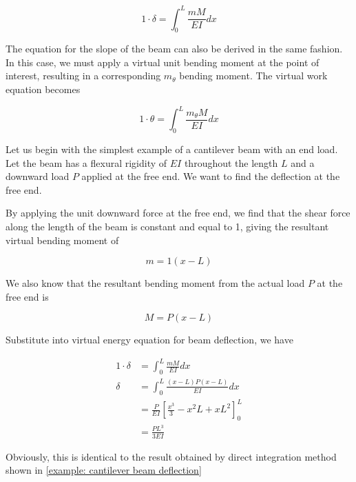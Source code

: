 \documentclass[
10pt,
a4paper,
openany,
svgnames,
]{kaobook} %
\begin{document}
\begin{equation}
  1 \cdot \delta = \int_0^L \frac{mM}{EI} dx
\end{equation}

The equation for the slope of the beam can also be derived in the same fashion. In this case, we must apply a virtual unit bending moment at the point of interest, resulting in a corresponding $m_\theta$ bending moment. The virtual work equation becomes

\begin{equation}
  1 \cdot \theta = \int_0^L \frac{m_\theta M}{EI} dx
\end{equation}

\begin{example}
  Let us begin with the simplest example of a cantilever beam with an end load. Let the beam has a flexural rigidity of $EI$ throughout the length $L$ and a downward load $P$ applied at the free end. We want to find the deflection at the free end.

  \centering
\end{example}
\begin{solution}
  By applying the unit downward force at the free end, we find that the shear force along the length of the beam is constant and equal to 1, giving the resultant virtual bending moment of

  \begin{equation*}
    m = 1(x - L)
  \end{equation*}

  We also know that the resultant bending moment from the actual load $P$ at the free end is

  \begin{equation*}
    M = P(x - L)
  \end{equation*}

  Substitute into virtual energy equation for beam deflection, we have

  \begin{align*}
    1 \cdot \delta &= \int_0^L \frac{mM}{EI} dx \\
    \delta &= \int_0^L \frac{(x-L)P(x-L)}{EI} dx \\
                   &= \frac{P}{EI} \left[ \frac{x^3}{3} - x^2L +  xL^2 \right]_0^L \\
                   &= \frac{PL^3}{3EI}
  \end{align*}

  Obviously, this is identical to the result obtained by direct integration method shown in \cref{example: cantilever beam deflection}
\end{solution}
\end{document}
